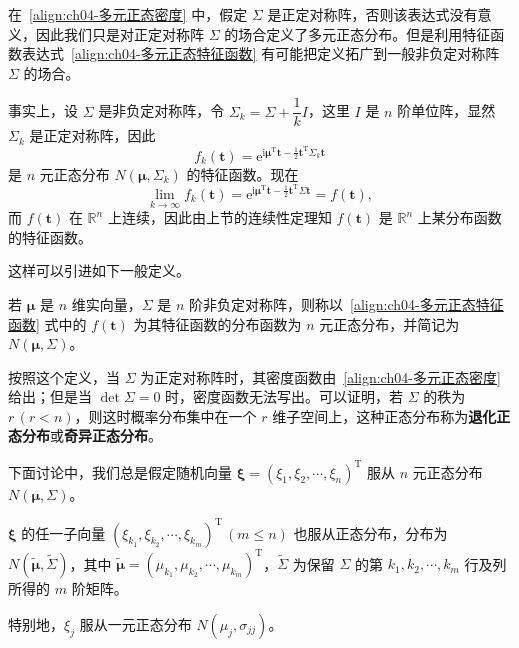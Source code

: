 \documentclass[../../main.tex]{subfiles}
\begin{document}
在~\eqref{align:ch04-多元正态密度} 中，假定 $\Sigma$ 是正定对称阵，否则该表达式没有意义，因此我们只是对正定对称阵 $\Sigma$ 的场合定义了多元正态分布。但是利用特征函数表达式~\eqref{align:ch04-多元正态特征函数} 有可能把定义拓广到一般非负定对称阵 $\Sigma$ 的场合。

事实上，设 $\Sigma$ 是非负定对称阵，令 $\Sigma_k=\Sigma+\dfrac{1}{k}I$，这里 $I$ 是 $n$ 阶单位阵，显然 $\Sigma_k$ 是正定对称阵，因此
\[
f_k(\boldsymbol{t})=\mathrm{e}^{\mathrm{i}\boldsymbol{\mu}^{\mathrm{T}}\boldsymbol{t}-\frac12\boldsymbol{t}^{\mathrm{T}}\Sigma_k\boldsymbol{t}}
\]
是 $n$ 元正态分布 $N(\boldsymbol{\mu},\Sigma_k)$ 的特征函数。现在
\[
\lim_{k\to\infty}f_k(\boldsymbol{t})=\mathrm{e}^{\mathrm{i}\boldsymbol{\mu}^{\mathrm{T}}\boldsymbol{t}-\frac12\boldsymbol{t}^{\mathrm{T}}\Sigma\boldsymbol{t}}=f(\boldsymbol{t}),
\]
而 $f(\boldsymbol{t})$ 在 $\mathbb{R}^n$ 上连续，因此由上节的连续性定理知 $f(\boldsymbol{t})$ 是 $\mathbb{R}^n$ 上某分布函数的特征函数。

这样可以引进如下一般定义。

\begin{definition}[一般 $n$ 元正态分布]\label{definition:ch04-一般多元正态}
若 $\boldsymbol{\mu}$ 是 $n$ 维实向量，$\Sigma$ 是 $n$ 阶非负定对称阵，则称以~\eqref{align:ch04-多元正态特征函数} 式中的 $f(\boldsymbol{t})$ 为其特征函数的分布函数为 $n$ 元正态分布，并简记为 $N(\boldsymbol{\mu},\Sigma)$。
\end{definition}

按照这个定义，当 $\Sigma$ 为正定对称阵时，其密度函数由~\eqref{align:ch04-多元正态密度} 给出；但是当 $\det\Sigma=0$ 时，密度函数无法写出。可以证明，若 $\Sigma$ 的秩为 $r\,(r<n)$，则这时概率分布集中在一个 $r$ 维子空间上，这种正态分布称为\textbf{退化正态分布}或\textbf{奇异正态分布}。

下面讨论中，我们总是假定随机向量 $\boldsymbol{\xi}=(\xi_1,\xi_2,\cdots,\xi_n)^{\mathrm{T}}$ 服从 $n$ 元正态分布 $N(\boldsymbol{\mu},\Sigma)$。

\begin{theorem}[边际分布仍是正态]\label{theorem:ch04-边际正态}
$\boldsymbol{\xi}$ 的任一子向量 $(\xi_{k_1},\xi_{k_2},\cdots,\xi_{k_m})^{\mathrm{T}}\,(m\leqslant n)$ 也服从正态分布，分布为 $N(\tilde{\boldsymbol{\mu}},\tilde{\Sigma})$，其中 $\tilde{\boldsymbol{\mu}}=(\mu_{k_1},\mu_{k_2},\cdots,\mu_{k_m})^{\mathrm{T}}$，$\tilde{\Sigma}$ 为保留 $\Sigma$ 的第 $k_1,k_2,\cdots,k_m$ 行及列所得的 $m$ 阶矩阵。

特别地，$\xi_j$ 服从一元正态分布 $N(\mu_j,\sigma_{jj})$。
\end{theorem}
\end{document}
